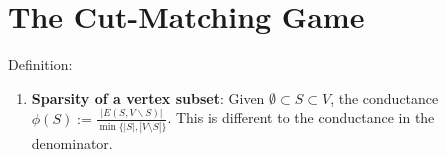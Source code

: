 \section{The Cut-Matching Game}
Definition:
\begin{enumerate}
    \item \textbf{Sparsity of a vertex subset}: Given $\emptyset \subset S \subset V$, the conductance $\phi(S) := \frac{|E(S, V \backslash S)|}{\min \{|S|, |V\setminus S|\}}$. This is different to the conductance in the denominator.
\end{enumerate}